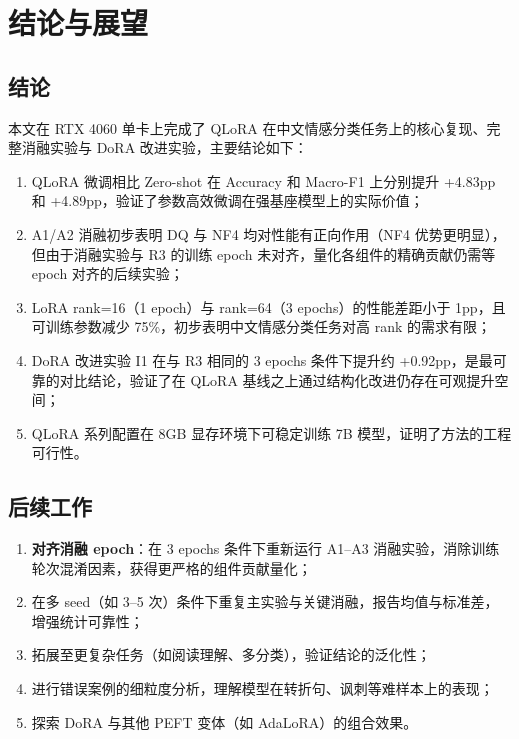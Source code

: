 \documentclass[12pt,a4paper]{article}
\begin{document}
\section{结论与展望}

\subsection{结论}

本文在 RTX 4060 单卡上完成了 QLoRA 在中文情感分类任务上的核心复现、完整消融实验与 DoRA 改进实验，主要结论如下：

\begin{enumerate}[leftmargin=2em]
  \item QLoRA 微调相比 Zero-shot 在 Accuracy 和 Macro-F1 上分别提升 +4.83pp 和 +4.89pp，验证了参数高效微调在强基座模型上的实际价值；
  \item A1/A2 消融初步表明 DQ 与 NF4 均对性能有正向作用（NF4 优势更明显），但由于消融实验与 R3 的训练 epoch 未对齐，量化各组件的精确贡献仍需等 epoch 对齐的后续实验；
  \item LoRA rank=16（1 epoch）与 rank=64（3 epochs）的性能差距小于 1pp，且可训练参数减少 75\%，初步表明中文情感分类任务对高 rank 的需求有限；
  \item DoRA 改进实验 I1 在与 R3 相同的 3 epochs 条件下提升约 +0.92pp，是最可靠的对比结论，验证了在 QLoRA 基线之上通过结构化改进仍存在可观提升空间；
  \item QLoRA 系列配置在 8GB 显存环境下可稳定训练 7B 模型，证明了方法的工程可行性。
\end{enumerate}

\subsection{后续工作}

\begin{enumerate}[leftmargin=2em]
  \item \textbf{对齐消融 epoch}：在 3 epochs 条件下重新运行 A1--A3 消融实验，消除训练轮次混淆因素，获得更严格的组件贡献量化；
  \item 在多 seed（如 3--5 次）条件下重复主实验与关键消融，报告均值与标准差，增强统计可靠性；
  \item 拓展至更复杂任务（如阅读理解、多分类），验证结论的泛化性；
  \item 进行错误案例的细粒度分析，理解模型在转折句、讽刺等难样本上的表现；
  \item 探索 DoRA 与其他 PEFT 变体（如 AdaLoRA）的组合效果。
\end{enumerate}
\end{document}
